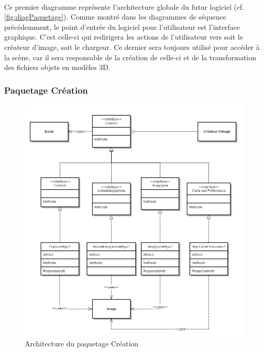 \paragraph{}
Ce premier diagramme représente l’architecture globale du futur logiciel (cf. \ref{fig:diagPaquetage}). Comme montré dans les diagrammes de séquence précédemment, le point d’entrée du logiciel pour l’utilisateur est l’interface graphique. C’est celle-ci qui redirigera les actions de l’utilisateur vers soit le créateur d’image, soit le chargeur. Ce dernier sera toujours utilisé pour accéder à la scène, car il sera responsable de la création de celle-ci et de la transformation des fichiers objets en modèles 3D.

\newpage

\subsubsection{Paquetage Création}

\begin{figure}[h]
		\centering
		\includegraphics[scale=0.4]{package_creation.jpg}
		\caption{\label{fig:paqCreation} Architecture du paquetage Création}
\end{figure}

